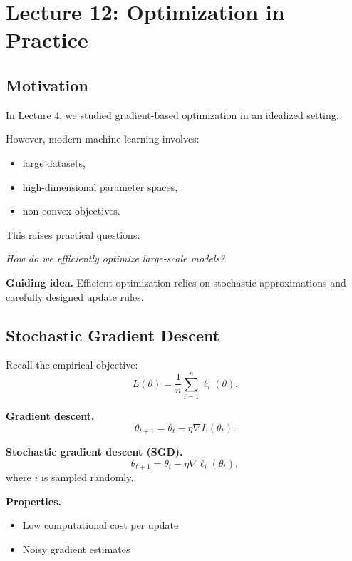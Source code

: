 \section{Lecture 12: Optimization in Practice}

\subsection{Motivation}

In Lecture 4, we studied gradient-based optimization in an idealized setting.

\medskip

\noindent
However, modern machine learning involves:

\begin{itemize}
    \item large datasets,
    \item high-dimensional parameter spaces,
    \item non-convex objectives.
\end{itemize}

\medskip

\noindent
This raises practical questions:

\medskip

\noindent
\textit{How do we efficiently optimize large-scale models?}

\medskip

\noindent
\textbf{Guiding idea.}  
Efficient optimization relies on stochastic approximations and carefully designed update rules.

\subsection{Stochastic Gradient Descent}

Recall the empirical objective:
\[
L(\theta) = \frac{1}{n} \sum_{i=1}^n \ell_i(\theta).
\]

\medskip

\noindent
\textbf{Gradient descent.}
\[
\theta_{t+1} = \theta_t - \eta \nabla L(\theta_t).
\]

\medskip

\noindent
\textbf{Stochastic gradient descent (SGD).}
\[
\theta_{t+1} = \theta_t - \eta \nabla \ell_i(\theta_t),
\]
where $i$ is sampled randomly.

\medskip

\noindent
\textbf{Properties.}
\begin{itemize}
    \item Low computational cost per update
    \item Noisy gradient estimates
\end{itemize}

